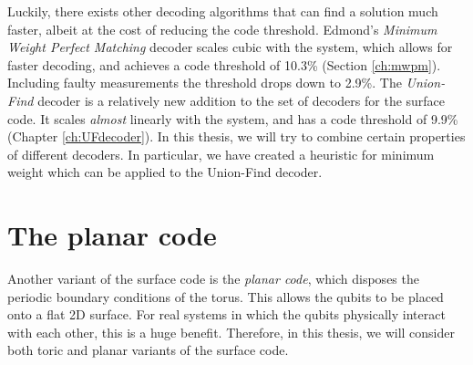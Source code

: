 Luckily, there exists other decoding algorithms that can find a solution much faster, albeit at the cost of reducing the code threshold. Edmond's \emph{Minimum Weight Perfect Matching} decoder scales cubic with the system, which allows for faster decoding, and achieves a code threshold of 10.3\% (Section \ref{ch:mwpm}). Including faulty measurements the threshold drops down to 2.9\%. The \emph{Union-Find} decoder is a relatively new addition to the set of decoders for the surface code. It scales \emph{almost} linearly with the system, and has a code threshold of 9.9\% (Chapter \ref{ch:UFdecoder}). In this thesis, we will try to combine certain properties of different decoders. In particular, we have created a heuristic for minimum weight which can be applied to the Union-Find decoder.

\section{The planar code}\label{sec:surface_planar}

Another variant of the surface code is the \emph{planar code}, which disposes the periodic boundary conditions of the torus. This allows the qubits to be placed onto a flat 2D surface. For real systems in which the qubits physically interact with each other, this is a huge benefit. Therefore, in this thesis, we will consider both toric and planar variants of the surface code.

\def\QS{15}
\def\s{1.5}

